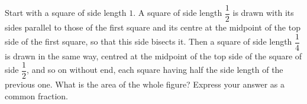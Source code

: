 Start with a square of side length $1$. A square of side length $\dfrac12$ is drawn with its sides parallel to those of the first square and its centre at the midpoint of the top side of the first square, so that this side bisects it. Then a square of side length $\dfrac14$ is drawn in the same way, centred at the midpoint of the top side of the square of side $\dfrac12$, and so on without end, each square having half the side length of the previous one. What is the area of the whole figure? Express your answer as a common fraction.
